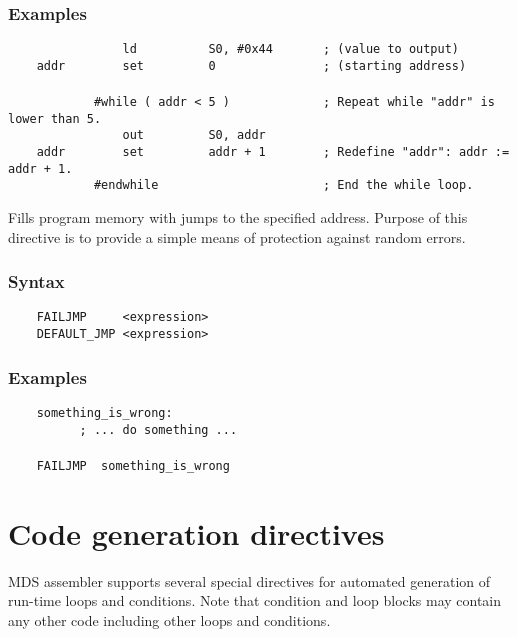         \subsubsection{Examples}
            \verb'                ld          S0, #0x44       ; (value to output)'\\
            \verb'    addr        set         0               ; (starting address)'\\
            \verb''\\
            \verb'            #while ( addr < 5 )             ; Repeat while "addr" is lower than 5.'\\
            \verb'                out         S0, addr'\\
            \verb'    addr        set         addr + 1        ; Redefine "addr": addr := addr + 1.'\\
            \verb'            #endwhile                       ; End the while loop.'

        Fills program memory with jumps to the specified address. Purpose of this directive is to provide a simple means of protection against random errors.

        \subsubsection{Syntax}
            \verb'    FAILJMP     <expression>'\\
            \verb'    DEFAULT_JMP <expression>'

        \subsubsection{Examples}
            \verb'    something_is_wrong:'\\
            \verb'          ; ... do something ...'\\
            \verb''\\
            \verb'    FAILJMP  something_is_wrong'

\clearpage
\section{Code generation directives}
    MDS assembler supports several special directives for automated generation of run-time loops and conditions. Note that condition and loop blocks may contain any other code including other loops and conditions.

